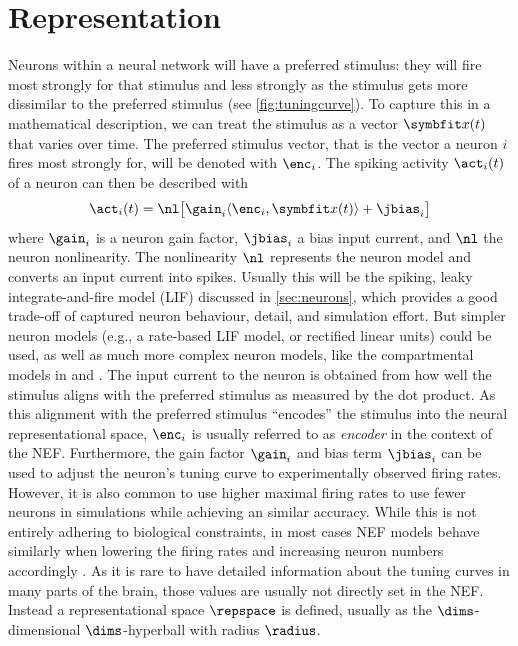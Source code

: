 \section{Representation}
Neurons within a neural network will have a preferred stimulus: they will fire most strongly for that stimulus and less strongly as the stimulus gets more dissimilar to the preferred stimulus (see \cref{fig:tuningcurve}).
To capture this in a mathematical description, we can treat the stimulus as a vector $\vc x(t)$ that varies over time.
The preferred stimulus vector, that is the vector a neuron $i$ fires most strongly for, will be denoted with $\enc_i$.
The spiking activity $\act_i(t)$ of a neuron can then be described with
\begin{equation}
    \act_i(t) = \nl\!\sbr{\gain_i \langle\enc_i, \vc x(t)\rangle + \jbias_i}
\end{equation}
where $\gain_i$ is a neuron gain factor, $\jbias_i$ a bias input current, and $\nl$ the neuron nonlinearity.
The nonlinearity $\nl$ represents the neuron model and converts an input current into spikes.
Usually this will be the spiking, leaky integrate-and-fire model (LIF) discussed in \cref{sec:neurons}, which provides a good trade-off of captured neuron behaviour, detail, and simulation effort.
But simpler neuron models (e.g., a rate-based LIF model, or rectified linear units) could be used, as well as much more complex neuron models, like the compartmental models in \textcite{eliasmith2016} and \textcite{duggins2017c}.
The input current to the neuron is obtained from how well the stimulus aligns with the preferred stimulus as measured by the dot product.
As this alignment with the preferred stimulus ``encodes'' the stimulus into the neural representational space, $\enc_i$ is usually referred to as \emph{encoder} in the context of the NEF\@.
Furthermore, the gain factor $\gain_i$ and bias term $\jbias_i$ can be used to adjust the neuron's tuning curve to experimentally observed firing rates.
However, it is also common to use higher maximal firing rates to use fewer neurons in simulations while achieving an similar accuracy.
While this is not entirely adhering to biological constraints, in most cases NEF models behave similarly when lowering the firing rates and increasing neuron numbers accordingly \parencite[e.g.,][]{gosmann2015}.
As it is rare to have detailed information about the tuning curves in many parts of the brain, those values are usually not directly set in the NEF\@.
Instead a representational space $\repspace$ is defined, usually as the $\dims$-dimensional $\dims$-hyperball with radius $\radius$.
